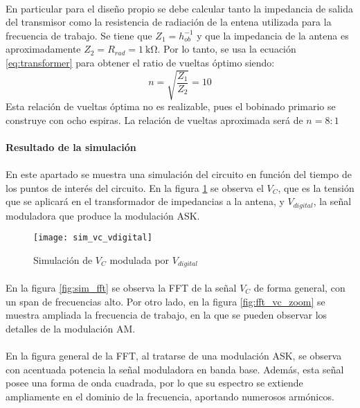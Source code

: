 \paragraph{}
En particular para el diseño propio se debe calcular tanto la impedancia de salida del transmisor como la resistencia de radiación de la entena utilizada para la frecuencia de trabajo.
Se tiene que $Z_1 = h_{ob}^{-1}$ y que la impedancia de la antena es aproximadamente $Z_2 = R_{rad} = \SI{1}{\kilo\ohm}$.
Por lo tanto, se usa la ecuaci\'on \ref{eq:transformer} para obtener el ratio de vueltas óptimo siendo: $$ n = \sqrt{\frac{Z_1}{Z_2}} = 10 $$
Esta relación de vueltas óptima no es realizable, pues el bobinado primario se construye con ocho espiras. La relación de vueltas aproximada será de $ n = 8:1 $


\paragraph{Resultado de la simulaci\'on} %
\paragraph{}
En este apartado se muestra una simulación del circuito en función del tiempo de los puntos de interés del circuito. 
En la figura \ref{fig:sim_vc_vdig} se observa el $V_C$, que es la tensión que se aplicará en el transformador de impedancias a la antena, y $V_{digital}$, la señal moduladora que produce la modulación ASK. 
\begin{figure}[h]
    \centering
    \texttt{[image: sim\_vc\_vdigital]}
    \caption{Simulaci\'on de $V_C$ modulada por $V_{digital}$}
    \label{fig:sim_vc_vdig}
\end{figure}
\paragraph{}
En la figura \ref{fig:sim_fft} se observa la FFT de la señal $V_C$ de forma general, con un span de frecuencias alto. Por otro lado, en la figura \ref{fig:fft_vc_zoom} se muestra ampliada la frecuencia de trabajo, en la que se pueden observar los detalles de la modulación AM.
\paragraph{}
En la figura general de la FFT, al tratarse de una modulación ASK, se observa con acentuada potencia la señal moduladora en banda base. Además, esta señal posee una forma de onda cuadrada, por lo que su espectro se extiende ampliamente en el dominio de la frecuencia, aportando numerosos armónicos.
